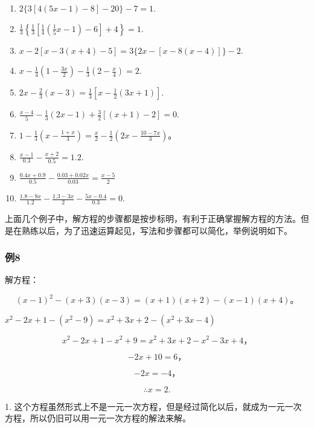 \begin{enumerate}[start=1]
\item
  \(2\{3[4(5x-1)-8]-20\}-7=1.\)
\item
  \(\frac{1}{3}\left\{\frac{1}{3}\left[\frac{1}{4}\left(\frac{1}{5}x - 1\right) - 6\right] + 4\right\} = 1.\)
\item
  \(x - 2[x - 3(x + 4) - 5] = 3\{2x - [x - 8(x - 4)]\} - 2.\)
\item
  \(x - \frac{1}{4}\left(1 - \frac{3x}{2}\right) - \frac{1}{3}\left(2 - \frac{x}{4}\right) = 2.\)
\item
  \(2x - \frac{2}{3}(x - 3) = \frac{1}{3}\left[x - \frac{1}{2}(3x + 1)\right].\)
\item
  \(\frac{x - 4}{5} - \frac{1}{3}(2x - 1) + \frac{3}{2}[(x + 1) - 2] = 0.\)
\item
  \(1 - \frac{1}{3}\left(x - \frac{1 + x}{3}\right) = \frac{x}{2} - \frac{1}{2}\left(2x - \frac{10 - 7x}{3}\right)\)。
\item
  \(\frac{x - 1}{0.3} -\frac{x + 2}{0.5} = 1.2.\)
\item
  \(\frac{0.4x + 0.9}{0.5} -\frac{0.03 + 0.02x}{0.03} = \frac{x - 5}{2}\)
\item
  \(\frac{1.8 - 8x}{1.2} -\frac{1.3 - 3x}{2} -\frac{5x - 0.4}{0.3} = 0.\)
\end{enumerate}

上面几个例子中，解方程的步骤都是按步标明，有利于正确掌握解方程的方法。但是在熟练以后，为了迅速运算起见，写法和步骤都可以简化，举例说明如下。

\subsubsection{例8}

解方程：

\[
(x - 1) ^ {2} - (x + 3) (x - 3) = (x + 1) (x + 2) - (x - 1) (x + 4)\text{。}
\]

\(x^{2} - 2x + 1 - (x^{2} - 9) = x^{2} + 3x + 2 - (x^{2} + 3x - 4)\)

\[
x ^ {2} - 2 x + 1 - x ^ {2} + 9 = x ^ {2} + 3 x + 2 - x ^ {2} - 3 x + 4\text{，}
\]

\[
- 2 x + 10 = 6\text{，}
\]

\[
- 2 x = - 4\text{，}
\]

\[
\therefore x = 2.
\]

 1.
这个方程虽然形式上不是一元一次方程，但是经过简化以后，就成为一元一次方程，所以仍旧可以用一元一次方程的解法来解。

